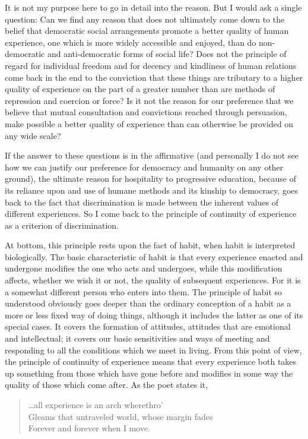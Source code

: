 It is not my purpose here to go in detail into the reason. But I would ask a single 
question: Can we find any reason that does not ultimately come down to the belief that 
democratic social arrangements promote a better quality of human experience, one which 
is more widely accessible and enjoyed, than do non-democratic and anti-democratic 
forms of social life? Does not the principle of regard for individual freedom and for 
decency and kindliness of human relations come back in the end to the conviction that 
these things are tributary to a higher quality of experience on the part of a greater number 
than are methods of repression and coercion or force? Is it not the reason for our 
preference that we believe that mutual consultation and convictions reached through 
persuasion, make possible a better quality of experience than can otherwise be provided 
on any wide scale? 

If the answer to these questions is in the affirmative (and personally I do not see how 
we can justify our preference for democracy and humanity on any other ground), the 
ultimate reason for hospitality to progressive education, because of its reliance upon and 
use of humane methods and its kinship to democracy, goes back to the fact that 
discrimination is made between the inherent values of different experiences. So I come 
back to the principle of continuity of experience as a criterion of discrimination. 

At bottom, this principle rests upon the fact of habit, when habit is interpreted 
biologically. The basic characteristic of habit is that every experience enacted and 
undergone modifies the one who acts and undergoes, while this modification affects, 
whether we wish it or not, the quality of subsequent experiences. For it is a somewhat different person who enters into them. The principle of habit so understood obviously 
goes deeper than the ordinary conception of a habit as a more or less fixed way of doing 
things, although it includes the latter as one of its special cases. It covers the formation of 
attitudes, attitudes that are emotional and intellectual; it covers our basic sensitivities and 
ways of meeting and responding to all the conditions which we meet in living. From this 
point of view, the principle of continuity of experience means that every experience both 
takes up something from those which have gone before and modifies in some way the 
quality of those which come after. As the poet states it, 

{\small
\begin{quotation}
\ldots all experience is an arch wherethro' \\
Gleams that untraveled world, whose margin fades \\
Forever and forever when I move. 
\end{quotation}
}

